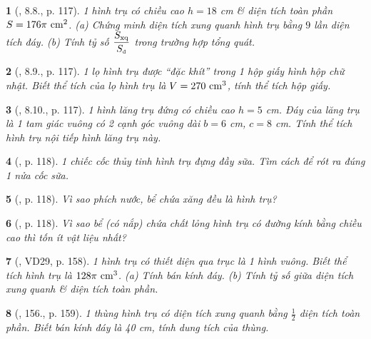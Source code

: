 \documentclass{article}
\newtheorem{baitoan}{}
\begin{document}
\begin{baitoan}[\cite{Binh_boi_duong_Toan_9_tap_2}, 8.8., p. 117]
	1 hình trụ có chiều cao $h = 18$ {\rm cm} \& diện tích toàn phần $S = 176\pi\ {\rm cm}^2$. (a) Chứng minh diện tích xung quanh hình trụ bằng $9$ lần diện tích đáy. (b) Tính tỷ số $\dfrac{S_{\rm xq}}{S_{\tiny\mbox{\rm đ}}}$ trong trường hợp tổng quát.
\end{baitoan}

\begin{baitoan}[\cite{Binh_boi_duong_Toan_9_tap_2}, 8.9., p. 117]
	1 lọ hình trụ được ``đặc khít'' trong 1 hộp giấy hình hộp chữ nhật. Biết thể tích của lọ hình trụ là $V = 270\ {\rm cm}^3$, tính thể tích hộp giấy.
\end{baitoan}

\begin{baitoan}[\cite{Binh_boi_duong_Toan_9_tap_2}, 8.10., p. 117]
	1 hình lăng trụ đứng có chiều cao $h = 5$ {\rm cm}. Đáy của lăng trụ là 1 tam giác vuông có 2 cạnh góc vuông dài $b = 6$ {\rm cm}, $c = 8$ {\rm cm}. Tính thể tích hình trụ nội tiếp hình lăng trụ này.
\end{baitoan}

\begin{baitoan}[\cite{Binh_boi_duong_Toan_9_tap_2}, p. 118]
	1 chiếc cốc thủy tinh hình trụ đựng đầy sữa. Tìm cách để rót ra đúng 1 nửa cốc sữa.
\end{baitoan}

\begin{baitoan}[\cite{Binh_boi_duong_Toan_9_tap_2}, p. 118]
	Vì sao phích nước, bể chứa xăng đều là hình trụ?
\end{baitoan}

\begin{baitoan}[\cite{Binh_boi_duong_Toan_9_tap_2}, p. 118]
	Vì sao bể (có nắp) chứa chất lỏng hình trụ có đường kính bằng chiều cao thì tốn ít vật liệu nhất?
\end{baitoan}

\begin{baitoan}[\cite{Tuyen_Toan_9_old}, VD29, p. 158]
	1 hình trụ có thiết diện qua trục là 1 hình vuông. Biết thể tích hình trụ là $128\pi\ {\rm cm}^3$. (a) Tính bán kính đáy. (b) Tính tỷ số giữa diện tích xung quanh \& diện tích toàn phần.
\end{baitoan}

\begin{baitoan}[\cite{Tuyen_Toan_9_old}, 156., p. 159]
	1 thùng hình trụ có diện tích xung quanh bằng $\frac{1}{2}$ diện tích toàn phần. Biết bán kính đáy là {\rm40 cm}, tính dung tích của thùng.
\end{baitoan}
\end{document}
